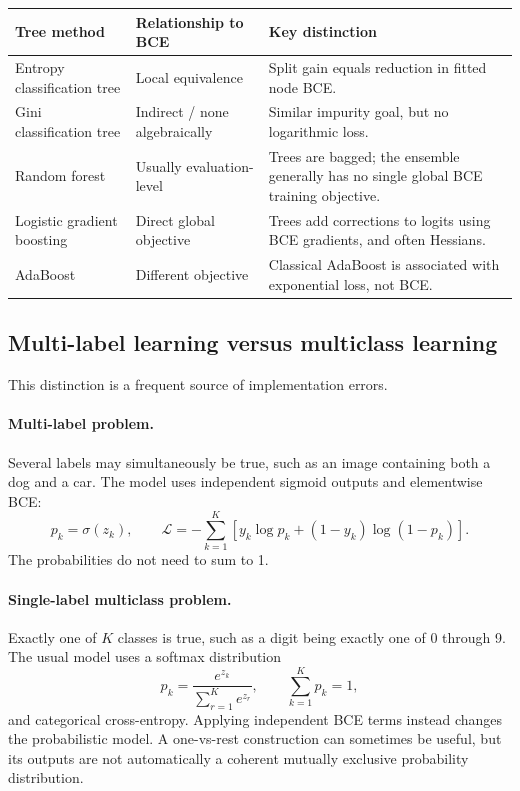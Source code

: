 \documentclass[11pt]{article}
\newcommand{\rowrule}{\specialrule{0.20pt}{1.25pt}{1.25pt}}
\newcommand{\sigmoid}{\sigma}
\theoremstyle{definition}
\begin{document}
\begin{center}
\begin{tabularx}{0.96\textwidth}{>{\raggedright\arraybackslash}p{}>{\raggedright\arraybackslash}p{}X}
\toprule
\textbf{Tree method} & \textbf{Relationship to BCE} & \textbf{Key distinction} \\
\midrule
Entropy classification tree & Local equivalence & Split gain equals reduction in fitted node BCE. \\
\rowrule
Gini classification tree & Indirect / none algebraically & Similar impurity goal, but no logarithmic loss. \\
\rowrule
Random forest & Usually evaluation-level & Trees are bagged; the ensemble generally has no single global BCE training objective. \\
\rowrule
Logistic gradient boosting & Direct global objective & Trees add corrections to logits using BCE gradients, and often Hessians. \\
\rowrule
AdaBoost & Different objective & Classical AdaBoost is associated with exponential loss, not BCE. \\
\bottomrule
\end{tabularx}
\end{center}

\subsection{Multi-label learning versus multiclass learning}

This distinction is a frequent source of implementation errors.

\paragraph{Multi-label problem.}
Several labels may simultaneously be true, such as an image containing both a dog and a car. The model uses independent sigmoid outputs and elementwise BCE:
\[
p_k=\sigmoid(z_k),
\qquad
\mathcal L=-\sum_{k=1}^{K}\left[y_k\log p_k+(1-y_k)\log(1-p_k)\right].
\]
The probabilities do not need to sum to 1.

\paragraph{Single-label multiclass problem.}
Exactly one of $K$ classes is true, such as a digit being exactly one of 0 through 9. The usual model uses a softmax distribution
\[
p_k=\frac{e^{z_k}}{\sum_{r=1}^{K}e^{z_r}},
\qquad
\sum_{k=1}^{K}p_k=1,
\]
and categorical cross-entropy. Applying independent BCE terms instead changes the probabilistic model. A one-vs-rest construction can sometimes be useful, but its outputs are not automatically a coherent mutually exclusive probability distribution.
\end{document}
